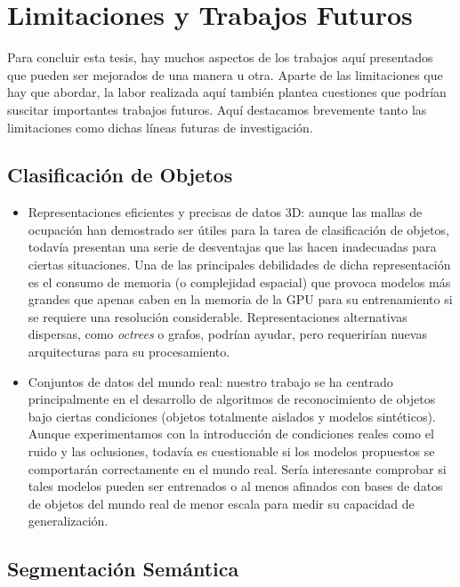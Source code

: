 \section{Limitaciones y Trabajos Futuros}
\label{cha:conclusion_sp:sec:future}

Para concluir esta tesis, hay muchos aspectos de los trabajos aquí presentados que pueden ser mejorados de una manera u otra. Aparte de las limitaciones que hay que abordar, la labor realizada aquí también plantea cuestiones que podrían suscitar importantes trabajos futuros. Aquí destacamos brevemente tanto las limitaciones como dichas líneas futuras de investigación.

\subsection{Clasificación de Objetos}

\begin{itemize}
    \item Representaciones eficientes y precisas de datos 3D: aunque las mallas de ocupación han demostrado ser útiles para la tarea de clasificación de objetos, todavía presentan una serie de desventajas que las hacen inadecuadas para ciertas situaciones. Una de las principales debilidades de dicha representación es el consumo de memoria (o complejidad espacial) que provoca modelos más grandes que apenas caben en la memoria de la \ac{GPU} para su entrenamiento si se requiere una resolución considerable. Representaciones alternativas dispersas, como \emph{octrees} o grafos, podrían ayudar, pero requerirían nuevas arquitecturas para su procesamiento.
    \item Conjuntos de datos del mundo real: nuestro trabajo se ha centrado principalmente en el desarrollo de algoritmos de reconocimiento de objetos bajo ciertas condiciones (objetos totalmente aislados y modelos sintéticos). Aunque experimentamos con la introducción de condiciones reales como el ruido y las oclusiones, todavía es cuestionable si los modelos propuestos se comportarán correctamente en el mundo real. Sería interesante comprobar si tales modelos pueden ser entrenados o al menos afinados con bases de datos de objetos del mundo real de menor escala para medir su capacidad de generalización.
\end{itemize}

\subsection{Segmentación Semántica}

